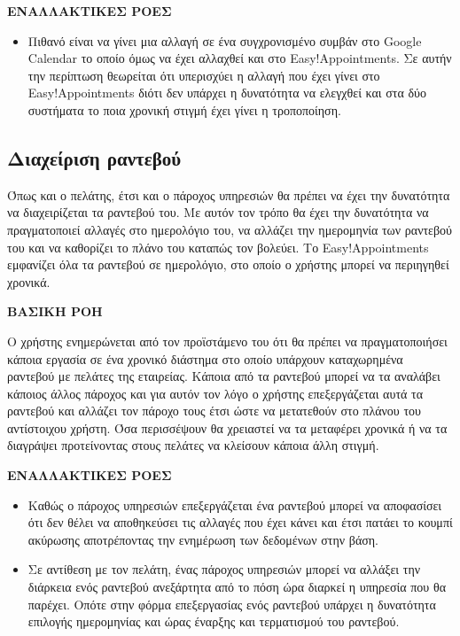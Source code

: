 \textbf{ΕΝΑΛΛΑΚΤΙΚΕΣ ΡΟΕΣ}

\begin{itemize}
\item Πιθανό είναι να γίνει μια αλλαγή σε ένα συγχρονισμένο συμβάν στο Google Calendar το οποίο όμως να έχει αλλαχθεί και στο Easy!Appointments. Σε αυτήν την περίπτωση θεωρείται ότι υπερισχύει η αλλαγή που έχει γίνει στο Easy!Appointments διότι δεν υπάρχει η δυνατότητα να ελεγχθεί και στα δύο συστήματα το ποια χρονική στιγμή έχει γίνει η τροποποίηση.
\end{itemize}

\subsection {Διαχείριση ραντεβού}
Όπως και ο πελάτης, έτσι και ο πάροχος υπηρεσιών θα πρέπει να έχει την δυνατότητα να διαχειρίζεται τα ραντεβού του. Με αυτόν τον τρόπο θα έχει την δυνατότητα να πραγματοποιεί αλλαγές στο ημερολόγιο του, να αλλάζει την ημερομηνία των ραντεβού του και να καθορίζει το πλάνο του καταπώς τον βολεύει. Το Easy!Appointments εμφανίζει όλα τα ραντεβού σε ημερολόγιο, στο οποίο ο χρήστης μπορεί να περιηγηθεί χρονικά.

\textbf{ΒΑΣΙΚΗ ΡΟΗ}

Ο χρήστης ενημερώνεται από τον προϊστάμενο του ότι θα πρέπει να πραγματοποιήσει κάποια εργασία σε ένα χρονικό διάστημα στο οποίο υπάρχουν καταχωρημένα ραντεβού με πελάτες της εταιρείας. Κάποια από τα ραντεβού μπορεί να τα αναλάβει κάποιος άλλος πάροχος και για αυτόν τον λόγο ο χρήστης επεξεργάζεται αυτά τα ραντεβού και αλλάζει τον πάροχο τους έτσι ώστε να μετατεθούν στο πλάνου του αντίστοιχου χρήστη. Όσα περισσέψουν θα χρειαστεί να τα μεταφέρει χρονικά ή να τα διαγράψει προτείνοντας στους πελάτες να κλείσουν κάποια άλλη στιγμή.

\textbf{ΕΝΑΛΛΑΚΤΙΚΕΣ ΡΟΕΣ}

\begin{itemize}
\item Καθώς ο πάροχος υπηρεσιών επεξεργάζεται ένα ραντεβού μπορεί να αποφασίσει ότι δεν θέλει να αποθηκεύσει τις αλλαγές που έχει κάνει και έτσι πατάει το κουμπί ακύρωσης αποτρέποντας την ενημέρωση των δεδομένων στην βάση.
\item Σε αντίθεση με τον πελάτη, ένας πάροχος υπηρεσιών μπορεί να αλλάξει την διάρκεια ενός ραντεβού ανεξάρτητα από το πόση ώρα διαρκεί η υπηρεσία που θα παρέχει. Οπότε στην φόρμα επεξεργασίας ενός ραντεβού υπάρχει η δυνατότητα επιλογής ημερομηνίας και ώρας έναρξης και τερματισμού του ραντεβού.
\end{itemize}

